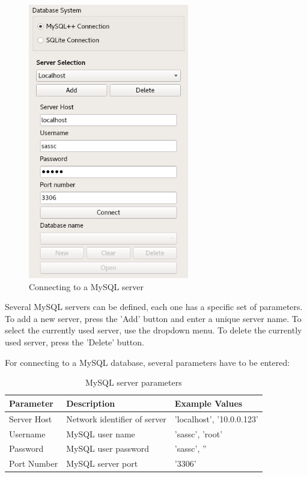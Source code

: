 \begin{figure}[H]
  \center
    \includegraphics[width=7cm,frame]{../screenshots/mysql_server_selection.png}
  \caption{Connecting to a MySQL server}
  \label{fig:mysql_connect}
\end{figure}

Several MySQL servers can be defined, each one has a specific set of parameters. To add a new server, press the 'Add' button and enter a unique server name. To select the currently used server, use the dropdown menu. To delete the currently used server, press the 'Delete' button.

For connecting to a MySQL database, several parameters have to be entered:

\begin{table}[H]
  \center
  \begin{tabular}{ | l | l | l |}
    \hline
    \textbf{Parameter} & \textbf{Description} & \textbf{Example Values} \\ \hline
    Server Host & Network identifier of server & 'localhost', '10.0.0.123' \\ \hline
    Username & MySQL user name & 'sassc', 'root' \\ \hline
    Password & MySQL user password & 'sassc', '' \\ \hline
    Port Number & MySQL server port & '3306' \\
    \hline
  \end{tabular}
  \caption{MySQL server parameters}
\end{table}

